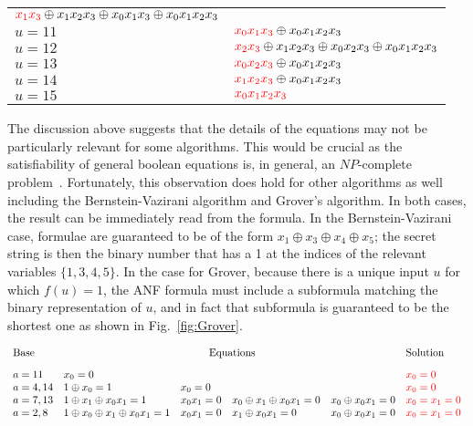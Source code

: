 \documentclass[sigplan,review]{acmart}
\newcommand{\red}[1]{{\color{red}{#1}}}
\begin{document}
\begin{figure*}
\begin{tabular}{ll}
  $\red{x_1x_3} \oplus x_1x_2x_3 \oplus x_0x_1x_3 \oplus x_0x_1x_2x_3$ \\
$u=11$ &
  $\red{x_0x_1x_3} \oplus x_0x_1x_2x_3$ \\
$u=12$ &
  $\red{x_2x_3} \oplus x_1x_2x_3 \oplus x_0x_2x_3 \oplus x_0x_1x_2x_3$ \\
$u=13$ &
  $\red{x_0x_2x_3} \oplus x_0x_1x_2x_3$ \\
$u=14$ &
  $\red{x_1x_2x_3} \oplus x_0x_1x_2x_3$ \\
$u=15$ &
  $\red{x_0x_1x_2x_3}$
\end{tabular}
\caption{\label{fig:Grover}Result of retrodictive execution for the Grover oracle ($n=4$, $w$ in the range $\{0..15\}$). The highlighted red subformula is the binary representation of the hidden input $u$.}
\end{figure*}

The discussion above suggests that the details of the equations may
not be particularly relevant for some algorithms. This would be
crucial as the satisfiability of general boolean equations is, in
general, an $\mathit{NP}$-complete
problem~\cite{4640789,Karp1972,10.1145/800157.805047}. Fortunately,
this observation does hold for other algorithms as well including the
Bernstein-Vazirani algorithm and Grover's algorithm. In both cases,
the result can be immediately read from the formula. In the
Bernstein-Vazirani case, formulae are guaranteed to be of the form
$x_1 \oplus x_3 \oplus x_4 \oplus x_5$; the secret string is then the
binary number that has a 1 at the indices of the relevant variables
$\{ 1,3,4,5 \}$. In the case for Grover, because there is a unique
input $u$ for which $f(u) = 1$, the ANF formula must include a
subformula matching the binary representation of $u$, and in fact that
subformula is guaranteed to be the shortest one as shown in
Fig.~\ref{fig:Grover}.

\begin{figure*}
\[\begin{array}{l@{\quad}lllll}
\textrm{Base} & \multicolumn{4}{c}{\textrm{Equations}} & \textrm{Solution} \\[2ex]
a=11 & x_0 = 0 &&&& \red{x_0 = 0} \\
a=4,14 & 1 \oplus x_0 = 1 & x_0 = 0 &&
  & \red{x_0 = 0} \\
a=7,13 & 1 \oplus x_1 \oplus x_0x_1 = 1 & x_0x_1 = 0 & x_0 \oplus x_1 \oplus x_0x_1 = 0 &  x_0 \oplus x_0x_1 = 0 & \red{x_0=x_1=0} \\
a=2,8 & 1 \oplus x_0 \oplus x_1 \oplus x_0x_1 = 1 & x_0x_1 = 0 & x_1 \oplus x_0x_1 = 0 & x_0 \oplus x_0x_1 = 0  & \red{x_0=x_1=0}
\end{array}\]
\caption{\label{fig:shor-eqs}Equations generated by retrodictive
  execution of $a^x \mod{15}$ for different values of $a$, starting
  from observed result 1 and unknown
  $x_8x_7x_6x_5x_4x_3x_2x_1x_0$. The solution for the unknown
  variables is given in the last column.}
\end{figure*}
\end{document}

